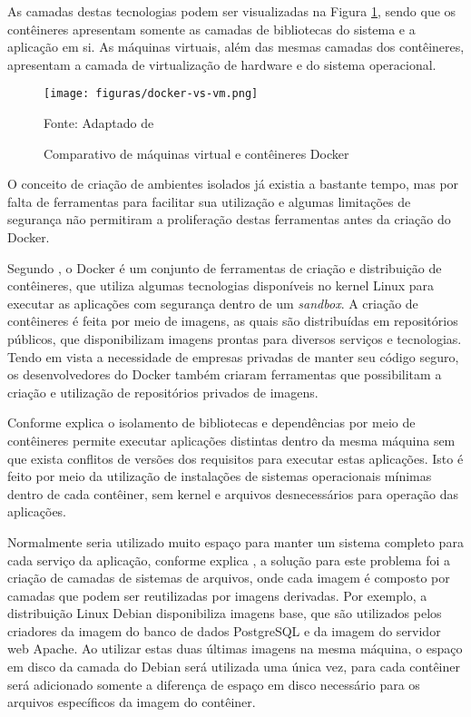 As camadas destas tecnologias podem ser visualizadas na Figura
\ref{fig:docker-vs-vm}, sendo que os contêineres apresentam somente as camadas
de bibliotecas do sistema e a aplicação em si. As máquinas virtuais, além das
mesmas camadas dos contêineres, apresentam a camada de virtualização de
hardware e do sistema operacional.

\begin{figure}[H]
	\centering
	\caption{Comparativo de máquinas virtual e contêineres Docker}
	\texttt{[image: figuras/docker-vs-vm.png]}

	\label{fig:docker-vs-vm}
	\footnotesize Fonte: Adaptado de 
\end{figure}

O conceito de criação de ambientes isolados já existia a bastante tempo, mas
por falta de ferramentas para facilitar sua utilização e algumas limitações
de segurança não permitiram a proliferação destas ferramentas antes da criação
do Docker.

Segundo , o Docker é um conjunto de ferramentas de
criação e distribuição de contêineres, que utiliza algumas tecnologias
disponíveis no kernel Linux para executar as aplicações com segurança dentro
de um \emph{sandbox}. A criação de contêineres é feita por meio de imagens,
as quais são distribuídas em repositórios públicos, que disponibilizam imagens
prontas para diversos serviços e tecnologias. Tendo em vista a necessidade
de empresas privadas de manter seu código seguro, os desenvolvedores do
Docker também criaram ferramentas que possibilitam a criação e utilização
de repositórios privados de imagens.

Conforme explica  o isolamento de bibliotecas e
dependências por meio de contêineres permite executar aplicações distintas
dentro da mesma máquina sem que exista conflitos de versões dos requisitos
para executar estas aplicações. Isto é feito por meio da utilização de
instalações de sistemas operacionais mínimas dentro de cada contêiner, sem
kernel e arquivos desnecessários para operação das aplicações.

Normalmente seria utilizado muito espaço para manter um sistema completo para
cada serviço da aplicação, conforme explica , a
solução para este problema foi a criação de camadas de sistemas de arquivos,
onde cada imagem é composto por camadas que podem ser reutilizadas por imagens
derivadas. Por exemplo, a distribuição Linux Debian disponibiliza imagens
base, que são utilizados pelos criadores da imagem do banco de dados
PostgreSQL e da imagem do servidor web Apache. Ao utilizar estas duas últimas
imagens na mesma máquina, o espaço em disco da camada do Debian será utilizada
uma única vez, para cada contêiner será adicionado somente a diferença de
espaço em disco necessário para os arquivos específicos da imagem do contêiner.

